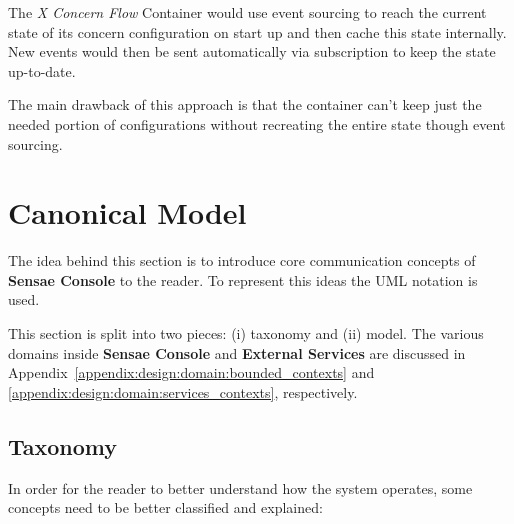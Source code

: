 The \textit{X Concern Flow} Container would use event sourcing to reach the current state of its concern configuration on start up and then cache this state internally. New events would then be sent automatically via subscription to keep the state up-to-date.

The main drawback of this approach is that the container can't keep just the needed portion of configurations without recreating the entire state though event sourcing.

\section{Canonical Model}
\label{sec:design:domain}

The idea behind this section is to introduce core communication concepts of \textbf{Sensae Console} to the reader. To represent this ideas the \gls{UML} notation is used.

This section is split into two pieces: (i) taxonomy and (ii) model.
The various domains inside \textbf{Sensae Console} and \textbf{External Services} are discussed in Appendix~\ref{appendix:design:domain:bounded_contexts} and \ref{appendix:design:domain:services_contexts}, respectively.

\subsection{Taxonomy}
\label{subsec:design:domain:taxonomy}

In order for the reader to better understand how the system operates, some concepts need to be better classified and explained:

